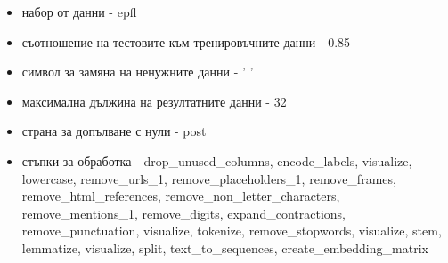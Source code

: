 \documentclass{article}
\begin{document}
\begin{itemize}
  \begin{itemize}
    \item набор от данни - epfl
    \item съотношение на тестовите към тренировъчните данни - 0.85
    \item символ за замяна на ненужните данни - ' '
    \item максимална дължина на резултатните данни - 32
    \item страна за допълване с нули - post
    \item стъпки за обработка - drop\_unused\_columns, encode\_labels, visualize, lowercase, remove\_urls\_1,
    remove\_placeholders\_1, remove\_frames, remove\_html\_references, remove\_non\_letter\_characters,
    remove\_mentions\_1, remove\_digits, expand\_contractions, remove\_punctuation, visualize, tokenize,
    remove\_stopwords, visualize, stem, lemmatize, visualize, split, text\_to\_sequences, create\_embedding\_matrix
  \end{itemize}


\end{itemize}
\end{document}
